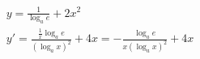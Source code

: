 \begin{ex}
\begin{align}
&y=\frac{1}{\log_{a}{e}}+2x^2\nonumber\\
&y'=\frac{\frac{1}{x}\log_{a}{e}}{(\log_{a}{x})^2}+4x=-\frac{\log_{a}{e}}{x(\log_{a}{x})^2}+4x\nonumber
\end{align}
\end{ex}